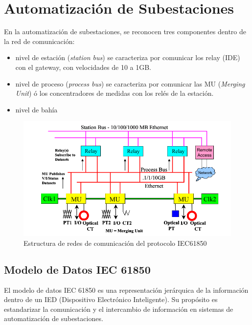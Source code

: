 \documentclass[a5paper]{book}%
\begin{document}
  \section{Automatización de Subestaciones}

En la automatización de subestaciones,  se reconocen  tres componentes dentro de la red de comunicación:

\begin{itemize}
\item nivel de estación (\textit{station bus}) se caracteriza por comunicar los relay (IDE)  con el gateway,  con velocidades de 10 a 1GB.
\item nivel de proceso (\textit{process bus}) se caracteriza por comunicar las MU (\textit{Merging Unit}) ó los concentradores de medidas con los relés de la estación.
\item nivel de bahía
\end{itemize}

\begin{figure}[H]
  \centering
  
  \caption{Estructura de redes de comunicación del protocolo IEC61850}
  \label{fig:iec61850}
  \includegraphics[width=\linewidth]{iec61850}
\end{figure}



\subsection{Modelo de Datos IEC 61850}

El modelo de datos IEC 61850 es una representación jerárquica de la información dentro de un IED (Dispositivo Electrónico Inteligente). Su propósito es estandarizar la comunicación y el intercambio de información en sistemas de automatización de subestaciones.
\end{document}
